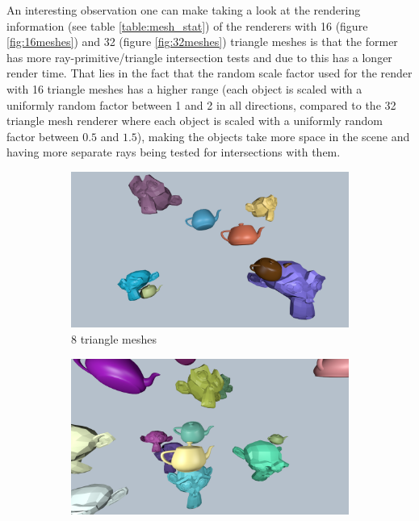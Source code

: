 \documentclass{article}
\begin{document}
An interesting observation one can make taking a look at the rendering information (see table \ref{table:mesh_stat}) of the renderers with 16 (figure \ref{fig:16meshes}) and 32 (figure \ref{fig:32meshes}) triangle meshes is that the former has more ray-primitive/triangle intersection tests and due to this has a longer render time. That lies in the fact that the random scale factor used for the render with 16 triangle meshes has a higher range (each object is scaled with a uniformly random factor between 1 and 2 in all directions, compared to the 32 triangle mesh renderer where each object is scaled with a uniformly random factor between $0.5$ and $1.5$), making the objects take more space in the scene and having more separate rays being tested for intersections with them.

\begin{figure}[h]
	\centering
	\begin{subfigure}{0.3\textwidth}
		\includegraphics[width=\textwidth]{8_triangle_meshes}
		\caption{8 triangle meshes}
		\label{fig:8meshes}
	\end{subfigure}%
	\hfill
	\begin{subfigure}{0.3\textwidth}
		\includegraphics[width=\textwidth]{16_triangle_meshes}

\end{subfigure}
\end{figure}
\end{document}
